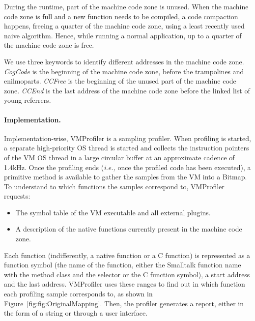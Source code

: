 \documentclass[10pt,nonatbib]{sigplanconf}
\newcommand{\ie}{\emph{i.e.,}\xspace}
\newcommand{\figref}[1]{Figure~\ref{fig:#1}}
\begin{document}
During the runtime, part of the machine code zone is unused. When the machine code zone is full and a new function needs to be compiled, a code compaction happens, freeing a quarter of the machine code zone, using a least recently used naive algorithm. Hence, while running a normal application, up to a quarter of the machine code zone is free. 

We use three keywords to identify different addresses in the machine code zone. \emph{CogCode} is the beginning of the machine code zone, before the trampolines and enilmoparts. \emph{CCFree} is the beginning of the unused part of the machine code zone. \emph{CCEnd} is the last address of the machine code zone before the linked list of young referrers.

\paragraph{Implementation.} Implementation-wise, VMProfiler is a sampling profiler. When profiling is started, a separate high-priority OS thread is started and collects the instruction pointers of the VM OS thread in a large circular buffer at an approximate cadence of 1.4kHz. Once the profiling ends (\ie once the profiled code has been executed), a primitive method is available to gather the samples from the VM into a Bitmap. To understand to which functions the samples correspond to, VMProfiler requests:
\begin{itemize}
	\item The symbol table of the VM executable and all external plugins.
	\item A description of the native functions currently present in the machine code zone.
\end{itemize}
Each function (indifferently, a native function or a C function) is represented as a function symbol (the name of the function, either the Smalltalk function name with the method class and the selector or the C function symbol), a start address and the last address. VMProfiler uses these ranges to find out in which function each profiling sample corresponds to, as shown in \figref{fig:OriginalMapping}. Then, the profiler generates a report, either in the form of a string or through a user interface.
\end{document}
